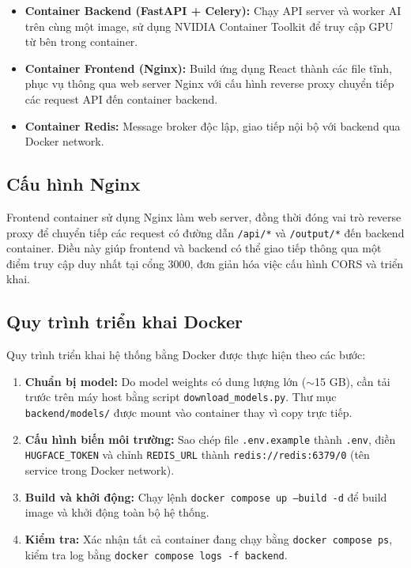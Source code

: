 \documentclass[../main.tex]{subfiles}
\begin{document}
\begin{itemize}
    \item \textbf{Container Backend (FastAPI + Celery):} Chạy API server và worker AI trên cùng một image, sử dụng NVIDIA Container Toolkit để truy cập GPU từ bên trong container.
    \item \textbf{Container Frontend (Nginx):} Build ứng dụng React thành các file tĩnh, phục vụ thông qua web server Nginx với cấu hình reverse proxy chuyển tiếp các request API đến container backend.
    \item \textbf{Container Redis:} Message broker độc lập, giao tiếp nội bộ với backend qua Docker network.
\end{itemize}

\subsection{Cấu hình Nginx}
Frontend container sử dụng Nginx làm web server, đồng thời đóng vai trò reverse proxy để chuyển tiếp các request có đường dẫn \texttt{/api/*} và \texttt{/output/*} đến backend container. Điều này giúp frontend và backend có thể giao tiếp thông qua một điểm truy cập duy nhất tại cổng 3000, đơn giản hóa việc cấu hình CORS và triển khai.

\subsection{Quy trình triển khai Docker}
Quy trình triển khai hệ thống bằng Docker được thực hiện theo các bước:

\begin{enumerate}
    \item \textbf{Chuẩn bị model:} Do model weights có dung lượng lớn ($\sim$15 GB), cần tải trước trên máy host bằng script \texttt{download\_models.py}. Thư mục \texttt{backend/models/} được mount vào container thay vì copy trực tiếp.
    \item \textbf{Cấu hình biến môi trường:} Sao chép file \texttt{.env.example} thành \texttt{.env}, điền \texttt{HUGFACE\_TOKEN} và chỉnh \texttt{REDIS\_URL} thành \texttt{redis://redis:6379/0} (tên service trong Docker network).
    \item \textbf{Build và khởi động:} Chạy lệnh \texttt{docker compose up --build -d} để build image và khởi động toàn bộ hệ thống.
    \item \textbf{Kiểm tra:} Xác nhận tất cả container đang chạy bằng \texttt{docker compose ps}, kiểm tra log bằng \texttt{docker compose logs -f backend}.
\end{enumerate}
\end{document}
